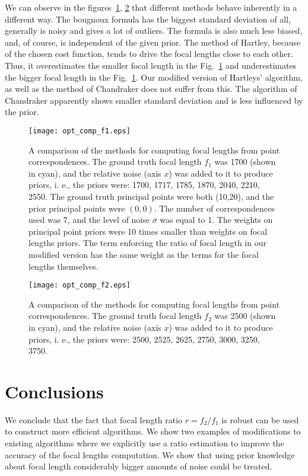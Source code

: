 We can observe in the figures~\ref{opt_comp_f1}, \ref{opt_comp_f2} that different methods behave inherently in a different way. The bougnoux formula has the biggest standard deviation of all, generally is noisy and gives a lot of outliers. The formula is also much less biased, and, of course, is independent of the given prior. The method of Hartley, because of the chosen cost function, tends to drive the focal lengths close to each other. Thus, it overestimates the smaller focal length in the Fig.~\ref{opt_comp_f1} and underestimates the bigger focal length in the Fig.~\ref{opt_comp_f1}. Our modified version of Hartleys' algorithm, as well as the method of Chandraker does not suffer from this. The algorithm of Chandraker apparently shows smaller standard deviation and is less influenced by the prior. 

\begin{figure}[h!]
  \begin{center}
    \texttt{[image: opt\_comp\_f1.eps]}
    \caption[Comparison of the focal length methods. f1]{A comparison of the methods for computing focal lengths from point correspondences.  The ground truth focal length $f_1$ was 1700 (shown in cyan), and the relative noise (axis $x$) was added to it to produce priors, i. e., the priors were: 1700, 1717, 1785, 1870, 2040, 2210, 2550.  The ground truth principal points were both (10,20), and the prior principal points were $(0, 0)$. The number of correspondences used was 7, and the level of noise $\sigma$ was equal to 1. The weights on principal point priors were 10 times smaller than weights on focal lengths priors. The term enforcing the ratio of focal length in our modified version has the same weight as the terms for the focal lengths themselves.}
    \label{opt_comp_f1}
  \end{center}
\end{figure}



\begin{figure}[h!]
  \begin{center}
    \texttt{[image: opt\_comp\_f2.eps]}
    \caption[Comparison of the focal length methods. f1]{A comparison of the methods for computing focal lengths from point correspondences.  The ground truth focal length $f_2$ was 2500 (shown in cyan), and the relative noise (axis $x$) was added to it to produce priors, i. e., the priors were: 2500, 2525, 2625, 2750, 3000, 3250, 3750.}
    \label{opt_comp_f2}
  \end{center}
\end{figure}

\section{Conclusions}
We conclude that the fact that focal length ratio $r= f_2\slash f_1$ is robust can be used to construct more efficient algorithms. We show two examples of modifications to existing algorithms where we explicitly use a ratio estimation to improve the accuracy of the focal lengths computation. We show that using prior knowledge about focal length considerably bigger amounts of noise could be treated.